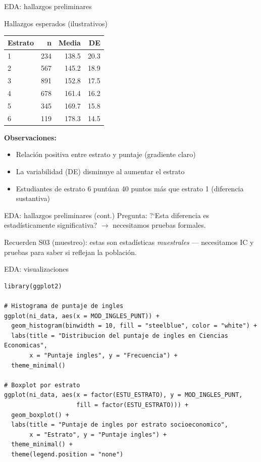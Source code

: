 \documentclass[aspectratio=169, 11pt]{beamer}
\begin{document}
\begin{frame}{EDA: hallazgos preliminares}
\begin{exampleblock}{Hallazgos esperados (ilustrativos)}
\small
\renewcommand{\arraystretch}{1.1}
\begin{tabular}{lrrr}
\toprule
\textbf{Estrato} & \textbf{n} & \textbf{Media} & \textbf{DE} \\
\midrule
1 & 234 & 138.5 & 20.3 \\
2 & 567 & 145.2 & 18.9 \\
3 & 891 & 152.8 & 17.5 \\
4 & 678 & 161.4 & 16.2 \\
5 & 345 & 169.7 & 15.8 \\
6 & 119 & 178.3 & 14.5 \\
\bottomrule
\end{tabular}
\end{exampleblock}

\textbf{Observaciones:}
\begin{itemize}\setlength{\itemsep}{0pt}
\item Relaci\'on positiva entre estrato y puntaje (gradiente claro)
\item La variabilidad (DE) disminuye al aumentar el estrato
\item Estudiantes de estrato 6 punt\'uan 40 puntos m\'as que estrato 1 (diferencia sustantiva)
\end{itemize}
\end{frame}

\begin{frame}{EDA: hallazgos preliminares (cont.)}
\textcolor{javeriana}{Pregunta}: ?`Esta diferencia es estad\'isticamente significativa? $\to$ necesitamos pruebas formales.

\vspace{0.3cm}
Recuerden S03 (muestreo): estas son estad\'isticas \textit{muestrales} --- necesitamos IC y pruebas para saber si reflejan la poblaci\'on.
\end{frame}

\begin{frame}[fragile]{EDA: visualizaciones}
\begin{lstlisting}
library(ggplot2)

# Histograma de puntaje de ingles
ggplot(ni_data, aes(x = MOD_INGLES_PUNT)) +
  geom_histogram(binwidth = 10, fill = "steelblue", color = "white") +
  labs(title = "Distribucion del puntaje de ingles en Ciencias Economicas",
       x = "Puntaje ingles", y = "Frecuencia") +
  theme_minimal()

# Boxplot por estrato
ggplot(ni_data, aes(x = factor(ESTU_ESTRATO), y = MOD_INGLES_PUNT,
                    fill = factor(ESTU_ESTRATO))) +
  geom_boxplot() +
  labs(title = "Puntaje de ingles por estrato socioeconomico",
       x = "Estrato", y = "Puntaje ingles") +
  theme_minimal() +
  theme(legend.position = "none")
\end{lstlisting}
\end{frame}
\end{document}
